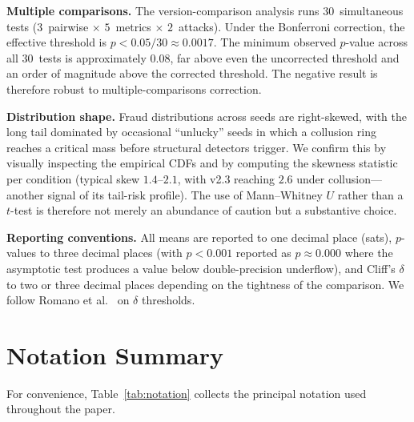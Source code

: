 \documentclass[sigconf,nonacm,10pt]{acmart}
\begin{document}
\noindent\textbf{Multiple comparisons.}
The version-comparison analysis runs $30$~simultaneous tests
($3$~pairwise $\times$ $5$~metrics $\times$ $2$~attacks). Under
the Bonferroni correction, the effective threshold is
$p < 0.05/30 \approx 0.0017$. The minimum observed $p$-value
across all $30$~tests is approximately $0.08$, far above even the
uncorrected threshold and an order of magnitude above the
corrected threshold. The negative result is therefore robust to
multiple-comparisons correction.

\noindent\textbf{Distribution shape.}
Fraud distributions across seeds are right-skewed, with the long
tail dominated by occasional ``unlucky'' seeds in which a
collusion ring reaches a critical mass before structural
detectors trigger. We confirm this by visually inspecting the
empirical CDFs and by computing the skewness statistic per
condition (typical skew $1.4$--$2.1$, with v2.3 reaching
$2.6$ under collusion---another signal of its tail-risk
profile). The use of Mann--Whitney $U$ rather than a $t$-test is
therefore not merely an abundance of caution but a substantive
choice.

\noindent\textbf{Reporting conventions.}
All means are reported to one decimal place (sats),
$p$-values to three decimal places (with $p < 0.001$ reported as
$p \approx 0.000$ where the asymptotic test produces a value
below double-precision underflow), and Cliff's $\delta$ to two
or three decimal places depending on the tightness of the
comparison. We follow Romano et al.~\cite{romano2006appropriate}
on $\delta$ thresholds.

\section{Notation Summary}
\label{app:notation}

For convenience, Table~\ref{tab:notation} collects the principal
notation used throughout the paper.
\end{document}
